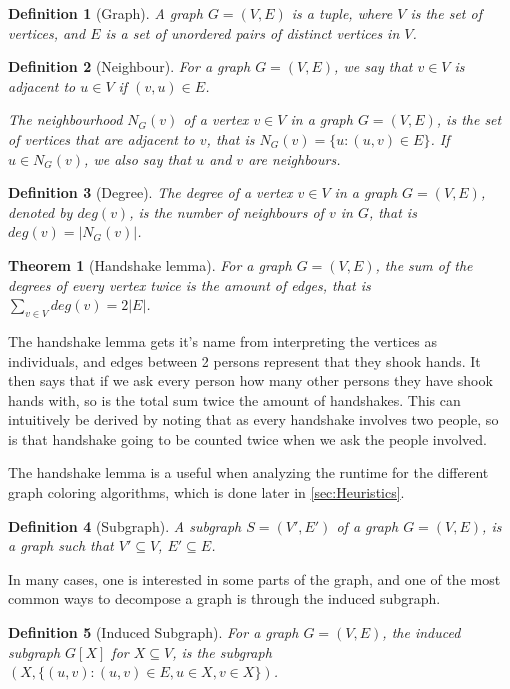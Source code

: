 \documentclass[a4paper]{article}
\newtheorem{theorem}{Theorem}[section]
\newtheorem{definition}{Definition}[section]
\begin{document}
\begin{definition}[Graph]
    A graph $G = (V,E)$ is a tuple, where $V$ is the set of vertices, and $E$ is
    a set of unordered pairs of distinct vertices in $V$.
\end{definition}
\begin{definition}[Neighbour]
    For a graph $G = (V,E)$, we say that $v \in V$ is adjacent to 
    $u \in V$ if $(v,u) \in E$. 

    The neighbourhood $N_G(v)$ of a vertex $v \in V$ in a graph $G = (V,E)$,
    is the set of vertices that are adjacent to $v$, that is 
    $N_G(v) = \{u : (u,v) \in E \}$. If $u \in N_G(v)$, we also say
    that $u$ and $v$ are neighbours.
\end{definition}
\begin{definition}[Degree]
    The degree of a vertex $v \in V$ in a graph $G = (V,E)$, denoted by 
    $deg(v)$, is the number of neighbours of $v$ in $G$, that is 
    $deg(v) = |N_G(v)|$.
\end{definition}
\begin{theorem}[Handshake lemma]{\cite{GraphBasics}}
    For a graph $G = (V,E)$, the sum of the degrees of every vertex twice is
    the amount of edges, that is $\sum_{v \in V} deg(v) = 2|E|$.
\end{theorem}

The handshake lemma gets it's name from interpreting the vertices as
individuals, and edges between 2 persons represent that they shook hands. It 
then says that if we ask every person how many other persons they have shook
hands with, so is the total sum twice the amount of handshakes. This can
intuitively be derived by noting that as every handshake involves two people, so
is that handshake going to be counted twice when we ask the people involved.

The handshake lemma is a useful when analyzing the runtime for 
the different graph coloring algorithms, which is done later in
\autoref{sec:Heuristics}.


\begin{definition}[Subgraph]
    A subgraph $S = (V',E')$ of a graph $G = (V,E)$, is a graph such that
    $V' \subseteq V$, $E' \subseteq E$.
\end{definition}
In many cases, one is interested in some parts of the graph, and one of the
most common ways to decompose a graph is through the induced subgraph.
\begin{definition}[Induced Subgraph]
    For a graph $G = (V,E)$, the induced subgraph $G[X]$ for $X \subseteq V$, is
    the subgraph $(X,\{(u,v) : (u,v) \in E, u \in X,v \in X\})$. 
\end{definition}
\end{document}
